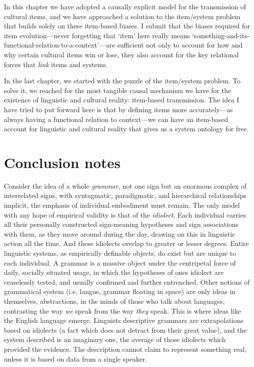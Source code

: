 In this chapter we have adopted a causally explicit model for the 
transmission of cultural items, and we have approached a solution to the 
item/system problem that builds solely on these item-based biases. I 
submit that the biases required for item evolution---never forgetting that 
\textquoteleft item' here really means 
\textquoteleft something-and-its-functional-relation-to-a-context'---are sufficient not 
only to account for how and why certain cultural items win or lose, they 
also account for the key relational forces that \textit{link }items 
and systems. 



In the last chapter, we started with the puzzle of the item/system problem. To solve it, we 
reached for the most tangible causal mechanism we have for the existence 
of linguistic and cultural reality: item-based transmission. The idea I 
have tried to put forward here is that by defining items more 
accurately---as always having a functional relation to context---we can have 
an item-based account for linguistic and cultural reality that gives us 
a system ontology for free.

\section{Conclusion notes}


Consider the idea of a whole \textit{grammar}, not one sign but an enormous complex of interrelated signs, with syntagmatic, paradigmatic, and hierarchical relationships implicit, the emphasis of individual embodiment must remain. The only model with any hope of empirical validity is that of the \textit{idiolect}. Each individual carries all their personally constructed sign-meaning hypotheses and sign associations with them, as they move around during the day, drawing on this in linguistic action all the time. And these idiolects overlap to greater or lesser degrees. Entire linguistic systems, as empirically definable objects, do exist but are unique to each individual. A grammar is a massive object under the centripetal force of daily, socially situated usage, in which the hypotheses of ones idiolect are ceaselessly tested, and usually confirmed and further entrenched. Other notions of grammatical system (i.e. langue, grammar floating in space) are only ideas in themselves, abstractions, in the minds of those who talk about languages, contrasting the way \textit{we} speak from the way \textit{they} speak. This is where ideas like the English language emerge. Linguists descriptive grammars are extrapolations based on idiolects (a fact which does not detract from their great value), and the system described is an imaginary one, the average of those idiolects which provided the evidence. The description cannot claim to represent something real, unless it is based on data from a single speaker.

